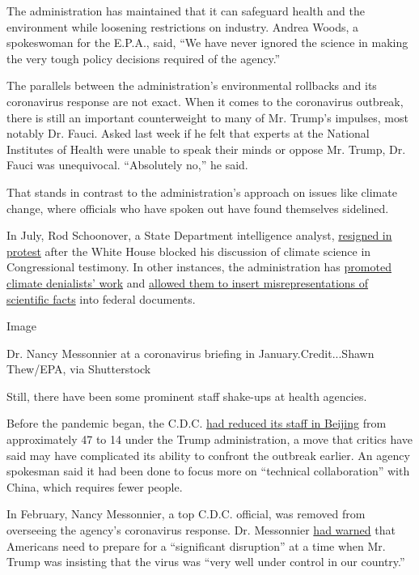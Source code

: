The administration has maintained that it can safeguard health and the
environment while loosening restrictions on industry. Andrea Woods, a
spokeswoman for the E.P.A., said, ``We have never ignored the science in
making the very tough policy decisions required of the agency.''

The parallels between the administration's environmental rollbacks and
its coronavirus response are not exact. When it comes to the coronavirus
outbreak, there is still an important counterweight to many of Mr.
Trump's impulses, most notably Dr. Fauci. Asked last week if he felt
that experts at the National Institutes of Health were unable to speak
their minds or oppose Mr. Trump, Dr. Fauci was unequivocal. ``Absolutely
no,'' he said.

That stands in contrast to the administration's approach on issues like
climate change, where officials who have spoken out have found
themselves sidelined.

In July, Rod Schoonover, a State Department intelligence analyst,
\href{https://www.nytimes.com/2019/07/10/climate/rod-schoonover-resigns.html}{resigned
in protest} after the White House blocked his discussion of climate
science in Congressional testimony. In other instances, the
administration has
\href{https://www.nytimes.com/2019/02/20/climate/climate-national-security-threat.html}{promoted
climate denialists' work} and
\href{https://www.nytimes.com/2020/03/02/climate/goks-uncertainty-language-interior.html}{allowed
them to insert misrepresentations of scientific facts} into federal
documents.

Image

Dr. Nancy Messonnier at a coronavirus briefing in January.Credit...Shawn
Thew/EPA, via Shutterstock

Still, there have been some prominent staff shake-ups at health
agencies.

Before the pandemic began, the C.D.C.
\href{https://www.reuters.com/article/us-health-coronavirus-china-cdc-exclusiv/exclusive-u-s-slashed-cdc-staff-inside-china-prior-to-coronavirus-outbreak-idUSKBN21C3N5}{had
reduced its staff in Beijing} from approximately 47 to 14 under the
Trump administration, a move that critics have said may have complicated
its ability to confront the outbreak earlier. An agency spokesman said
it had been done to focus more on ``technical collaboration'' with
China, which requires fewer people.

In February, Nancy Messonnier, a top C.D.C. official, was removed from
overseeing the agency's coronavirus response. Dr. Messonnier
\href{https://www.nytimes.com/2020/03/07/us/politics/trump-coronavirus.html}{had
warned} that Americans need to prepare for a ``significant disruption''
at a time when Mr. Trump was insisting that the virus was ``very well
under control in our country.''

